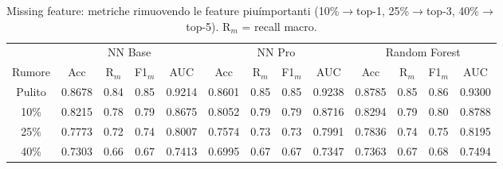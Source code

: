 \begin{table}[H]\centering\footnotesize
\setlength{\tabcolsep}{4pt}
\caption{Missing feature: metriche rimuovendo le feature piu\' importanti (10\%$\to$top-1, 25\%$\to$top-3, 40\%$\to$top-5). R$_m$ = recall macro.}\label{tab:mf}
\begin{tabular}{c *{12}{c}}
\toprule
 & \multicolumn{4}{c}{NN Base} & \multicolumn{4}{c}{NN Pro} & \multicolumn{4}{c}{Random Forest}\\
\cmidrule(lr){2-5}\cmidrule(lr){6-9}\cmidrule(lr){10-13}
Rumore & Acc & R$_m$ & F1$_m$ & AUC & Acc & R$_m$ & F1$_m$ & AUC & Acc & R$_m$ & F1$_m$ & AUC \\
\midrule
Pulito & 0.8678 & 0.84 & 0.85 & 0.9214 & 0.8601 & 0.85 & 0.85 & 0.9238 & 0.8785 & 0.85 & 0.86 & 0.9300 \\
10\% & 0.8215 & 0.78 & 0.79 & 0.8675 & 0.8052 & 0.79 & 0.79 & 0.8716 & 0.8294 & 0.79 & 0.80 & 0.8788 \\
25\% & 0.7773 & 0.72 & 0.74 & 0.8007 & 0.7574 & 0.73 & 0.73 & 0.7991 & 0.7836 & 0.74 & 0.75 & 0.8195 \\
40\% & 0.7303 & 0.66 & 0.67 & 0.7413 & 0.6995 & 0.67 & 0.67 & 0.7347 & 0.7363 & 0.67 & 0.68 & 0.7494 \\
\bottomrule
\end{tabular}
\end{table}
